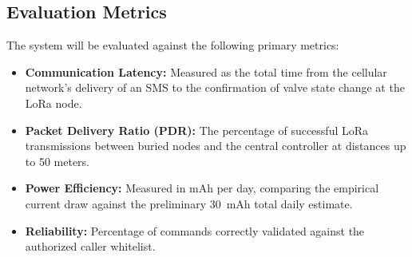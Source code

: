 \documentclass[conference]{IEEEtran}
\begin{document}
\subsection{Evaluation Metrics}
The system will be evaluated against the following primary metrics:
\begin{itemize}
    \item \textbf{Communication Latency:} Measured as the total time from the cellular network's delivery of an SMS to the confirmation of valve state change at the LoRa node.
    \item \textbf{Packet Delivery Ratio (PDR):} The percentage of successful LoRa transmissions between buried nodes and the central controller at distances up to 50 meters.
    \item \textbf{Power Efficiency:} Measured in mAh per day, comparing the empirical current draw against the preliminary 30~mAh total daily estimate.
    \item \textbf{Reliability:} Percentage of commands correctly validated against the authorized caller whitelist.
\end{itemize}

\end{document}
